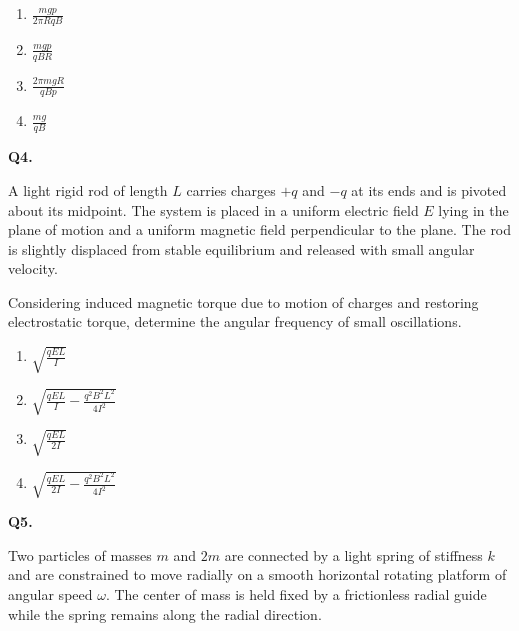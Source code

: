 \documentclass[12pt]{article}
\begin{document}
\begin{enumerate}
\item[(A)] $\displaystyle \frac{mgp}{2\pi R qB}$
\item[(B)] $\displaystyle \frac{mgp}{qBR}$
\item[(C)] $\displaystyle \frac{2\pi mgR}{qBp}$
\item[(D)] $\displaystyle \frac{mg}{qB}$
\end{enumerate}


\textbf{Q4.}

A light rigid rod of length $L$ carries charges $+q$ and $-q$ at its ends and is pivoted about its midpoint. The system is placed in a uniform electric field $E$ lying in the plane of motion and a uniform magnetic field perpendicular to the plane. The rod is slightly displaced from stable equilibrium and released with small angular velocity.

Considering induced magnetic torque due to motion of charges and restoring electrostatic torque, determine the angular frequency of small oscillations.

\begin{center}
\end{center}

\begin{enumerate}
\item[(A)] $\sqrt{\frac{qEL}{I}}$
\item[(B)] $\sqrt{\frac{qEL}{I} - \frac{q^2B^2L^2}{4I^2}}$
\item[(C)] $\sqrt{\frac{qEL}{2I}}$
\item[(D)] $\sqrt{\frac{qEL}{2I} - \frac{q^2B^2L^2}{4I^2}}$
\end{enumerate}


\textbf{Q5.}

Two particles of masses $m$ and $2m$ are connected by a light spring of stiffness $k$ and are constrained to move radially on a smooth horizontal rotating platform of angular speed $\omega$. The center of mass is held fixed by a frictionless radial guide while the spring remains along the radial direction.
\end{document}

